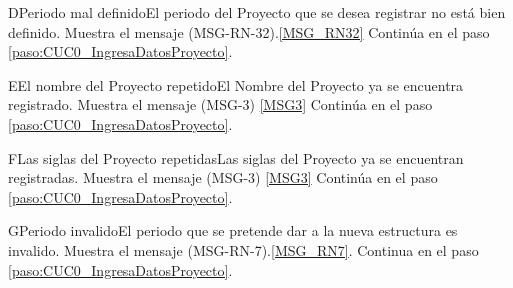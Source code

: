 	\begin{UCtrayectoriaA}{D}{Periodo mal definido}{El periodo del Proyecto que se desea registrar no está bien definido.}
			\UCpaso Muestra el mensaje (MSG-RN-32).\ref{MSG_RN32}
			\UCpaso Continúa en el paso \ref{paso:CUC0_IngresaDatosProyecto}.
	\end{UCtrayectoriaA}


	\begin{UCtrayectoriaA}{E}{El nombre del Proyecto repetido}{El Nombre del Proyecto ya se encuentra registrado.}
			\UCpaso Muestra el mensaje (MSG-3) \ref{MSG3}
			\UCpaso Continúa en el paso \ref{paso:CUC0_IngresaDatosProyecto}.
	\end{UCtrayectoriaA}
	
	\begin{UCtrayectoriaA}{F}{Las siglas del Proyecto repetidas}{Las siglas del Proyecto ya se encuentran registradas.}
			\UCpaso Muestra el mensaje (MSG-3) \ref{MSG3}
			\UCpaso Continúa en el paso \ref{paso:CUC0_IngresaDatosProyecto}.
	\end{UCtrayectoriaA}

	\begin{UCtrayectoriaA}{G}{Periodo invalido}{El periodo que se pretende dar a la nueva estructura es invalido.}
		\UCpaso Muestra el mensaje (MSG-RN-7).\ref{MSG_RN7}.
		\UCpaso Continua en el paso \ref{paso:CUC0_IngresaDatosProyecto}.
	\end{UCtrayectoriaA}






















